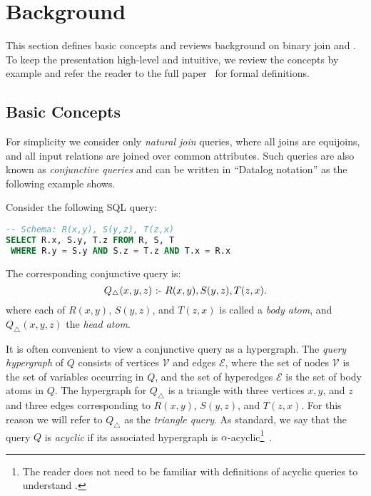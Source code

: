 \section{Background}\label{sec:background}

This section defines basic concepts and reviews background on binary
join and \GJ.
To keep the presentation high-level and intuitive,
we review the concepts by example
and refer the reader to the full paper~\cite{10.1145/3589295}
for formal definitions.

\subsection{Basic Concepts}\label{sec:basic-concepts}

For simplicity we consider only {\em natural join} queries,
where all joins are equijoins, and all input relations
are joined over common attributes.
Such queries are also known as {\em conjunctive queries}
and can be written in ``Datalog notation'' as the following
example shows.

\begin{example} \label{ex:triangle} Consider the following SQL query:
  \begin{lstlisting}[language=SQL]
-- Schema: R(x,y), S(y,z), T(z,x)
SELECT R.x, S.y, T.z FROM R, S, T 
 WHERE R.y = S.y AND S.z = T.z AND T.x = R.x
\end{lstlisting}
  The corresponding conjunctive query is:
  $$Q_{\triangle}(x,y,z) \text{ :- } R(x, y), S(y,z), T(z, x).$$
  where each of $R(x, y)$, $S(y,z)$, and $T(z, x)$
  is called a {\em body atom}, and $Q_\triangle(x, y, z)$
  the {\em head atom}.
\end{example}

It is often convenient to view a conjunctive query as
a hypergraph.  The \emph{query hypergraph} of $Q$ consists of vertices
$\mathcal{V}$ and edges $\mathcal{E}$, where the set of nodes
$\mathcal{V}$ is the set of variables occurring in $Q$, and the set of
hyperedges $\mathcal{E}$ is the set of body atoms in $Q$.
The hypergraph for $Q_\triangle$ is a triangle with three
vertices $x, y$, and $z$ and three edges corresponding to
$R(x, y)$, $S(y,z)$, and $T(z, x)$.
For this reason we will refer to $Q_\triangle$ as the {\em triangle
    query}.
As standard, we
say that the query $Q$ is {\em acyclic} if its associated hypergraph
is $\alpha$-acyclic\footnote{The reader does not need to be familiar
  with definitions of acyclic queries to understand \FJ.}~\cite{DBLP:journals/jacm/Fagin83}.


